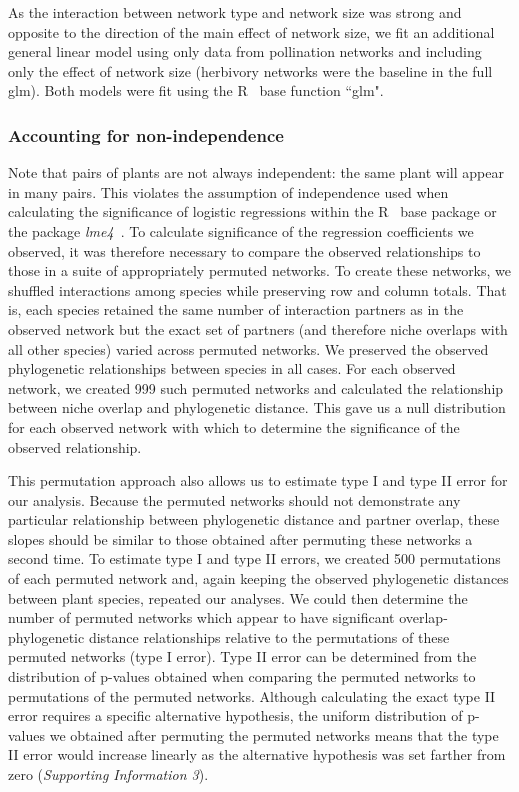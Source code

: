 \documentclass[12pt]{article}
\begin{document}
\begin{spacing}{1.5}
    As the interaction between network type and network size was strong and opposite to the direction of the main effect of network size, we fit an additional general linear model using only data from pollination networks and including only the effect of network size (herbivory networks were the baseline in the full glm). Both models were fit using the R~\citep{R} base function ``glm".


    \subsubsection*{Accounting for non-independence}

      Note that pairs of plants are not always independent: the same plant will 
      appear in many pairs. This violates the assumption of independence used 
      when calculating the significance of logistic regressions within 
      the R~\citep{R} base package or the package \emph{lme4}~\citep{lme4}. To 
      calculate significance of the regression coefficients we observed, it was 
      therefore necessary to compare the observed relationships to those in a 
      suite of appropriately permuted networks. To create these networks, we 
      shuffled interactions among species while preserving row and column 
      totals. That is, each species retained the same number of interaction 
      partners as in the observed network but the exact set of partners (and 
      therefore niche overlaps with all other species) varied across permuted 
      networks. We preserved the observed phylogenetic relationships between 
      species in all cases. For each observed network, we created 999 such 
      permuted networks and calculated the relationship between niche overlap 
      and phylogenetic distance. This gave us a null distribution for each 
      observed network with which to determine the significance of the observed 
      relationship.


      This permutation approach also allows us to estimate type I and type II 
      error for our analysis. Because the permuted networks should not demonstrate any particular relationship between phylogenetic distance and partner overlap, these slopes should be similar to those obtained after permuting these networks a second time.
      To estimate type I and type II errors, we created 500 permutations of each 
      permuted network and, again keeping the observed phylogenetic distances 
      between plant species, repeated our analyses. We could then determine the 
      number of permuted networks which appear to have significant 
      overlap-phylogenetic distance relationships relative to the permutations 
      of these permuted networks (type I error). Type II error can be determined
      from the distribution of p-values obtained when comparing the permuted 
      networks to permutations of the permuted networks. Although calculating 
      the exact type II error requires a specific alternative hypothesis, the 
      uniform distribution of p-values we obtained after permuting the permuted 
      networks means that the type II error would increase linearly as the 
      alternative hypothesis was set farther from zero (\emph{Supporting Information 3}).



\end{spacing}
\end{document}
